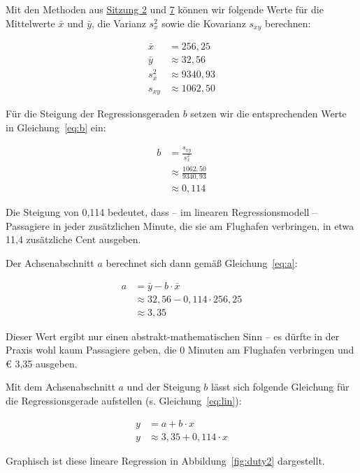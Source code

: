 \documentclass[
  11pt,
  ngerman,
  a4paper,
]{report}
\begin{document}
Mit den Methoden aus \protect\hyperlink{einleitende-bemerkungen}{Sitzung 2} und \protect\hyperlink{kovarianz}{7} können wir folgende Werte für die Mittelwerte \(\bar{x}\) und \(\bar{y}\), die Varianz \(s^2_x\) sowie die Kovarianz \(s_{xy}\) berechnen:

\[
\begin{aligned}
\bar{x}&=256{,}25\\
\bar{y}&\approx 32{,}56\\
s^2_{x}&\approx9340{,}93\\
s_{xy}&\approx 1062{,}50
\end{aligned}
\]

Für die Steigung der Regressionsgeraden \(b\) setzen wir die entsprechenden Werte in Gleichung~\eqref{eq:b} ein:

\nopagebreak

\[
\begin{aligned}
b&=\frac{s_{xy}}{s^2_x}\\
 &\approx\frac{1062{,}50}{9340{,}93}\\
 &\approx0{,}114
\end{aligned}
\]

Die Steigung von 0,114 bedeutet, dass -- im linearen Regressionsmodell -- Passagiere in jeder zusätzlichen Minute, die sie am Flughafen verbringen, in etwa 11,4 zusätzliche Cent ausgeben.

Der Achsenabschnitt \(a\) berechnet sich dann gemäß Gleichung~\eqref{eq:a}:

\nopagebreak

\[
\begin{aligned}
a&=\bar{y}-b\cdot\bar{x}\\
&\approx 32{,}56-0{,}114\cdot256{,}25\\
&\approx 3{,}35
\end{aligned}
\]

Dieser Wert ergibt nur einen abstrakt-mathematischen Sinn -- es dürfte in der Praxis wohl kaum Passagiere geben, die 0 Minuten am Flughafen verbringen und € 3,35 ausgeben.

Mit dem Achsenabschnitt \(a\) und der Steigung \(b\) lässt sich folgende Gleichung für die Regressionsgerade aufstellen (s. Gleichung~\eqref{eq:lin}):

\[
\begin{aligned}
y&=a+b\cdot x\\
y&\approx3{,}35 + 0{,}114 \cdot x
\end{aligned}
\]

Graphisch ist diese lineare Regression in Abbildung~\ref{fig:duty2} dargestellt.
\end{document}
